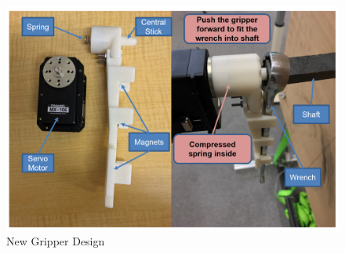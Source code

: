 \documentclass{standalone}
\begin{document}
 \begin{figure}%
    \begin{center}
    \includegraphics[keepaspectratio=true, width=1\linewidth,
      height=0.3\textheight]{sections//task2//images//gripper.png}
      \end{center}
    \caption{New Gripper Design}
    \label{gripper}
 \end{figure}
\end{document}
